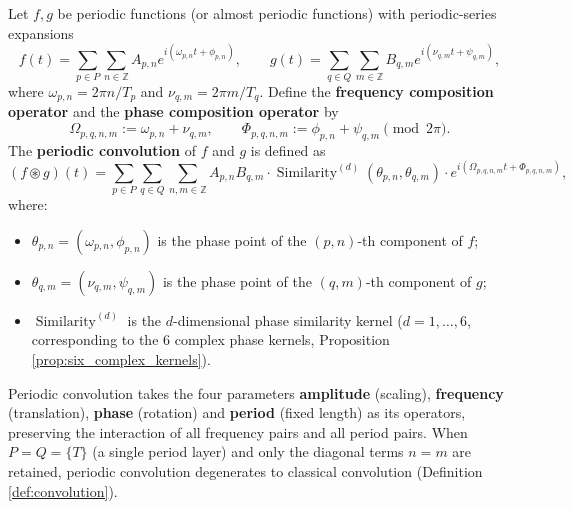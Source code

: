 \begin{definition}\label{def:periodic_convolution}
Let $f, g$ be periodic functions (or almost periodic functions) with periodic-series expansions
\[
f(t) = \sum_{p \in P} \sum_{n \in \mathbb{Z}} A_{p,n} e^{i(\omega_{p,n} t + \phi_{p,n})}, \qquad
g(t) = \sum_{q \in Q} \sum_{m \in \mathbb{Z}} B_{q,m} e^{i(\nu_{q,m} t + \psi_{q,m})},
\]
where $\omega_{p,n} = 2\pi n / T_p$ and $\nu_{q,m} = 2\pi m / T_q$. Define the \textbf{frequency composition operator} and the \textbf{phase composition operator} by
\[
\Omega_{p,q,n,m} := \omega_{p,n} + \nu_{q,m}, \qquad
\Phi_{p,q,n,m} := \phi_{p,n} + \psi_{q,m} \pmod{2\pi}.
\]
The \textbf{periodic convolution} of $f$ and $g$ is defined as
\[
(f \circledast g)(t) = \sum_{p \in P} \sum_{q \in Q} \sum_{n, m \in \mathbb{Z}} A_{p,n} B_{q,m} \cdot \operatorname{Similarity}^{(d)}(\theta_{p,n}, \theta_{q,m}) \cdot e^{i(\Omega_{p,q,n,m} t + \Phi_{p,q,n,m})},
\]
where:
\begin{itemize}
    \item $\theta_{p,n} = (\omega_{p,n}, \phi_{p,n})$ is the phase point of the $(p,n)$-th component of $f$;
    \item $\theta_{q,m} = (\nu_{q,m}, \psi_{q,m})$ is the phase point of the $(q,m)$-th component of $g$;
    \item $\operatorname{Similarity}^{(d)}$ is the $d$-dimensional phase similarity kernel ($d = 1, \dots, 6$, corresponding to the 6 complex phase kernels, Proposition \ref{prop:six_complex_kernels}).
\end{itemize}
Periodic convolution takes the four parameters \textbf{amplitude} (scaling), \textbf{frequency} (translation), \textbf{phase} (rotation) and \textbf{period} (fixed length) as its operators, preserving the interaction of all frequency pairs and all period pairs. When $P = Q = \{T\}$ (a single period layer) and only the diagonal terms $n = m$ are retained, periodic convolution degenerates to classical convolution (Definition \ref{def:convolution}).
\end{definition}

